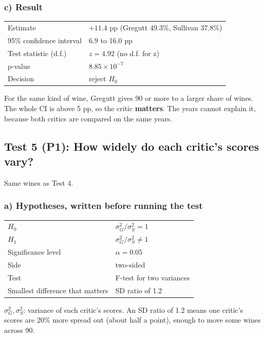 \documentclass[10pt,a4paper,twocolumn]{article}
\begin{document}
\subsubsection*{c) Result}
{\small
\begin{tabularx}{\columnwidth}{@{}HL@{}}
\toprule
Estimate & $+11.4$ pp (Gregutt 49.3\%, Sullivan 37.8\%)\\
95\% confidence interval & 6.9 to 16.0 pp\\
Test statistic (d.f.) & $z = 4.92$ (no d.f. for z)\\
p-value & $8.85 \times 10^{-7}$\\
Decision & reject $H_0$\\
\bottomrule
\end{tabularx}\par}

For the same kind of wine, Gregutt gives 90 or more to a larger share of wines. The whole CI is above 5 pp, so the critic \textbf{matters}.
The years cannot explain it, because both critics are compared on the same years.

\subsection*{Test 5 (P1): How widely do each critic's scores vary?}
Same wines as Test 4.

\subsubsection*{a) Hypotheses, written before running the test}
{\small
\begin{tabularx}{\columnwidth}{@{}HL@{}}
\toprule
$H_0$ & $\sigma_G^2 / \sigma_S^2 = 1$\\
$H_1$ & $\sigma_G^2 / \sigma_S^2 \neq 1$\\
Significance level & $\alpha = 0.05$\\
Side & two-sided\\
Test & F-test for two variances\\
Smallest difference that matters & SD ratio of 1.2\\
\bottomrule
\end{tabularx}\par}

$\sigma_G^2, \sigma_S^2$: variance of each critic's scores. An SD ratio of 1.2 means one critic's scores are 20\% more
spread out (about half a point), enough to move some wines across 90.
\end{document}
